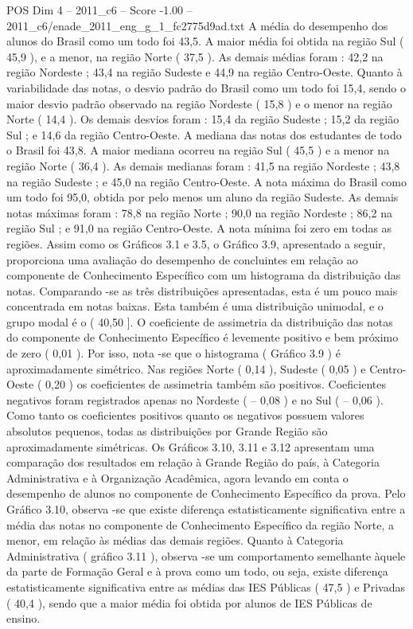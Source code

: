 \begin{textsample}{POS Dim 4 – 2011\_c6 – Score -1.00 – 2011\_c6/enade\_2011\_eng\_g\_1\_fc2775d9ad.txt}
A média do desempenho dos alunos do Brasil como um todo foi 43,5.
A maior média foi obtida na região Sul ( 45,9 ), e a menor, na região Norte ( 37,5 ).
As demais médias foram : 42,2 na região Nordeste ; 43,4 na região Sudeste e 44,9 na região Centro-Oeste.
Quanto à variabilidade das notas, o desvio padrão do Brasil como um todo foi 15,4, sendo o maior desvio padrão observado na região Nordeste ( 15,8 ) e o menor na região Norte ( 14,4 ).
Os demais desvios foram : 15,4 da região Sudeste ; 15,2 da região Sul ; e 14,6 da região Centro-Oeste.
A mediana das notas dos estudantes de todo o Brasil foi 43,8.
A maior mediana ocorreu na região Sul ( 45,5 ) e a menor na região Norte ( 36,4 ).
As demais medianas foram : 41,5 na região Nordeste ; 43,8 na região Sudeste ; e 45,0 na região Centro-Oeste.
A nota máxima do Brasil como um todo foi 95,0, obtida por pelo menos um aluno da região Sudeste.
As demais notas máximas foram : 78,8 na região Norte ; 90,0 na região Nordeste ; 86,2 na região Sul ; e 91,0 na região Centro-Oeste.
A nota mínima foi zero em todas as regiões.
Assim como os Gráficos 3.1 e 3.5, o Gráfico 3.9, apresentado a seguir, proporciona uma avaliação do desempenho de concluintes em relação ao componente de Conhecimento Específico com um histograma da distribuição das notas.
Comparando -se as três distribuições apresentadas, esta é um pouco mais concentrada em notas baixas.
Esta também é uma distribuição unimodal, e o grupo modal é o ( 40,50 ].
O coeficiente de assimetria da distribuição das notas do componente de Conhecimento Específico é levemente positivo e bem próximo de zero ( 0,01 ).
Por isso, nota -se que o histograma ( Gráfico 3.9 ) é aproximadamente simétrico.
Nas regiões Norte ( 0,14 ), Sudeste ( 0,05 ) e Centro-Oeste ( 0,20 ) os coeficientes de assimetria também são positivos.
Coeficientes negativos foram registrados apenas no Nordeste ( – 0,08 ) e no Sul ( – 0,06 ).
Como tanto os coeficientes positivos quanto os negativos possuem valores absolutos pequenos, todas as distribuições por Grande Região são aproximadamente simétricas.
Os Gráficos 3.10, 3.11 e 3.12 apresentam uma comparação dos resultados em relação à Grande Região do país, à Categoria Administrativa e à Organização Acadêmica, agora levando em conta o desempenho de alunos no componente de Conhecimento Específico da prova.
Pelo Gráfico 3.10, observa -se que existe diferença estatisticamente significativa entre a média das notas no componente de Conhecimento Específico da região Norte, a menor, em relação às médias das demais regiões.
Quanto à Categoria Administrativa ( gráfico 3.11 ), observa -se um comportamento semelhante àquele da parte de Formação Geral e à prova como um todo, ou seja, existe diferença estatisticamente significativa entre as médias das IES Públicas ( 47,5 ) e Privadas ( 40,4 ), sendo que a maior média foi obtida por alunos de IES Públicas de ensino.

\end{textsample}
